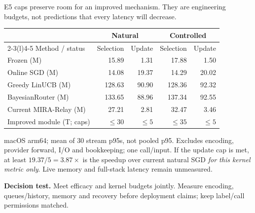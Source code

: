 \documentclass[10pt,letterpaper]{article}
\newcommand{\T}[1]{{\color{GuideBlue}#1}}
\newcommand{\note}[1]{{\fontsize{8.5}{10.5}\selectfont #1\par}}
\newcommand{\sectionhead}[1]{\vspace{7pt}{\large\bfseries #1}\par\vspace{3pt}}
\newenvironment{clean}{\begin{center}\fontsize{9.5}{11.5}\selectfont\setlength{\tabcolsep}{8pt}\renewcommand{\arraystretch}{1.10}}{\end{center}}
\begin{document}
\newpage
\sectionhead{4. Retain efficiency while adding useful capacity}
E5 caps preserve room for an improved mechanism. They are engineering budgets, not predictions that every latency will decrease.
\par\noindent\begin{minipage}{\linewidth}\end{minipage}\par
\begin{clean}
\begin{tabular}{@{}lrrrr@{}}
\toprule
& \multicolumn{2}{c}{Natural} & \multicolumn{2}{c}{Controlled} \\
\cmidrule(lr){2-3}\cmidrule(l){4-5}
Method / status & Selection & Update & Selection & Update \\
\midrule
Frozen (M) & 15.89 & 1.31 & 17.88 & 1.50 \\
Online SGD (M) & 14.08 & 19.37 & 14.29 & 20.02 \\
Greedy LinUCB (M) & 128.63 & 90.90 & 128.36 & 92.32 \\
BayesianRouter (M) & 133.65 & 88.96 & 137.34 & 92.55 \\
Current MIRA-Relay (M) & 27.21 & 2.81 & 32.47 & 3.46 \\
\midrule
\T{Improved module (T; caps)} & \T{$\leq30$} & \T{$\leq5$} & \T{$\leq35$} & \T{$\leq5$} \\

\bottomrule
\end{tabular}
\end{clean}
\note{macOS arm64; mean of 30 stream p95s, not pooled p95. Excludes encoding, provider forward, I/O and bookkeeping; one call/input. If the update cap is met, at least $19.37/5=3.87\times$ is the speedup over current natural SGD \emph{for this kernel metric only}. Live memory and full-stack latency remain unmeasured.}
\textbf{Decision test.} Meet efficacy and kernel budgets jointly. Measure encoding, queues/history, memory and recovery before deployment claims; keep label/call permissions matched.
\end{document}

